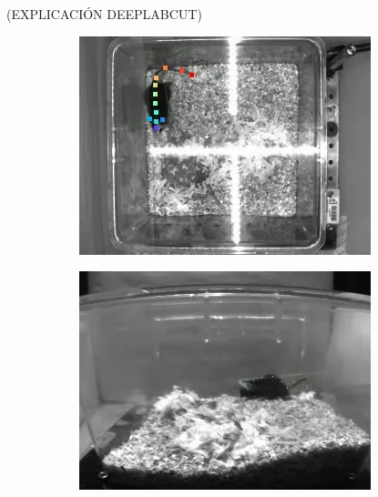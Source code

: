 (EXPLICACIÓN DEEPLABCUT)

\begin{figure}[p]
  \centering
  \begin{subfigure}{0.45\textwidth}
    \centering
    \includegraphics[width=\textwidth, angle=-90]{figures/deeplabcut-top-example-4128-2020-12-02-1-00-37.jpg}
    \caption{}
    \label{fig:deeplabcut-top-example}
  \end{subfigure}
  \begin{subfigure}{0.45\textwidth}
    \centering
    \includegraphics[width=\textwidth]{figures/deeplabcut-lateral-example-4128-2020-12-02-1-00-37.jpg}
    \caption{}
    \label{fig:deeplabcut-lateral-example}
  \end{subfigure}

\end{figure}
